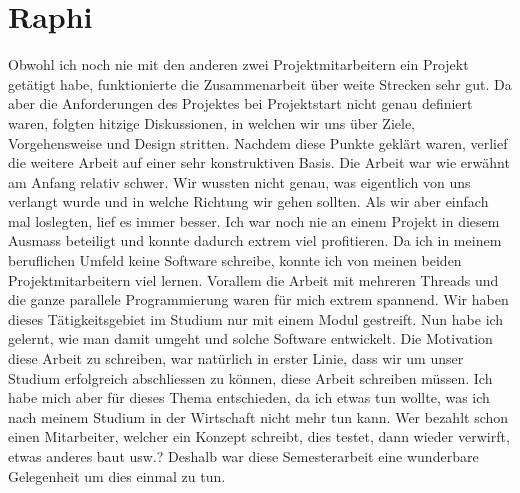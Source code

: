 \section{Raphi}
Obwohl ich noch nie mit den anderen zwei Projektmitarbeitern ein Projekt getätigt habe, funktionierte die Zusammenarbeit über weite Strecken sehr gut. Da aber die Anforderungen des Projektes bei Projektstart nicht genau definiert waren, folgten hitzige Diskussionen, in welchen wir uns über Ziele, Vorgehensweise und Design stritten. Nachdem diese Punkte geklärt waren, verlief die weitere Arbeit auf einer sehr konstruktiven Basis. \newline
Die Arbeit war wie erwähnt am Anfang relativ schwer. Wir wussten nicht genau, was eigentlich von uns verlangt wurde und in welche Richtung wir gehen sollten. Als wir aber einfach mal loslegten, lief es immer besser. Ich war noch nie an einem Projekt in diesem Ausmass beteiligt und konnte dadurch extrem viel profitieren. Da ich in meinem beruflichen Umfeld keine Software schreibe, konnte ich von meinen beiden Projektmitarbeitern viel lernen. \newline
Vorallem die Arbeit mit mehreren Threads und die ganze parallele Programmierung waren für mich extrem spannend. Wir haben dieses Tätigkeitsgebiet im Studium nur mit einem Modul gestreift. Nun habe ich gelernt, wie man damit umgeht und solche Software entwickelt. \newline
Die Motivation diese Arbeit zu schreiben, war natürlich in erster Linie, dass wir um unser Studium erfolgreich abschliessen zu können, diese Arbeit schreiben müssen. Ich habe mich aber für dieses Thema entschieden, da ich etwas tun wollte, was ich nach meinem Studium in der Wirtschaft nicht mehr tun kann. Wer bezahlt schon einen Mitarbeiter, welcher ein Konzept schreibt, dies testet, dann wieder verwirft, etwas anderes baut usw.? Deshalb war diese Semesterarbeit eine wunderbare Gelegenheit um dies einmal zu tun.

